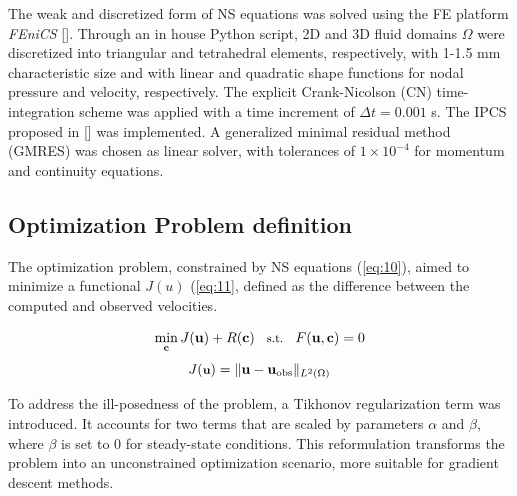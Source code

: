The weak and discretized form of NS equations was solved using the FE platform \emph{FEniCS} [\cite{alnaes2015fenics}]. Through an in house Python script, 2D and 3D fluid domains $\Omega$ were discretized into triangular and tetrahedral elements, respectively,  with 1-1.5 mm characteristic size and with linear and quadratic shape functions for nodal pressure and velocity, respectively. The explicit Crank-Nicolson (CN) time-integration scheme was applied with a time increment of $\Delta t = 0.001$ s. The IPCS proposed in [\cite{Dokken2020}] was implemented. A generalized minimal residual method (GMRES) was chosen as linear solver, with tolerances of $1 \times 10^{-4}$ for momentum and continuity equations.

\subsection*{Optimization Problem definition}
The optimization problem, constrained by NS equations (\cref{eq:10}), aimed to minimize a functional $J(u)$ (\cref{eq:11}, defined as the difference between the computed and observed velocities.

\begin{equation}
\small
\min_{\mathbf{c}} J(\mathbf{u}) + R(\mathbf{c}) \quad \text{s.t.} \quad F(\mathbf{u}, \mathbf{c}) = 0
\label{eq:10}
\end{equation}
\begin{equation}
\small
    J(\textbf{u}) = \| \mathbf{u} - \mathbf{u}_{\text{obs}} \|_{L^2(\Omega)}
    \label{eq:2.19}
\end{equation}

To address the ill-posedness of the problem, a Tikhonov regularization term was introduced. It accounts for two terms that are scaled by parameters \(\alpha\) and \(\beta\), where \(\beta\) is set to $0$ for steady-state conditions. This reformulation transforms the problem into an unconstrained optimization scenario, more suitable for gradient descent methods. 

